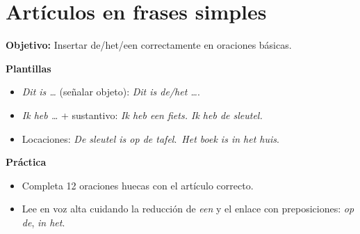 \section{Artículos en frases simples}
\textbf{Objetivo:} Insertar de/het/een correctamente en oraciones básicas.

\textbf{Plantillas}
\begin{itemize}[leftmargin=*]
  \item \textit{Dit is \ldots{}} (señalar objeto): \textit{Dit is de/het \ldots{}}.
  \item \textit{Ik heb \ldots{}} + sustantivo: \textit{Ik heb een fiets. Ik heb de sleutel.}
  \item Locaciones: \textit{De sleutel is op de tafel}.\ \textit{Het boek is in het huis}.
\end{itemize}

\textbf{Práctica}
\begin{itemize}[leftmargin=*]
  \item Completa 12 oraciones huecas con el artículo correcto.
  \item Lee en voz alta cuidando la reducción de \textit{een} y el enlace con preposiciones: \textit{op de}, \textit{in het}.
\end{itemize}
